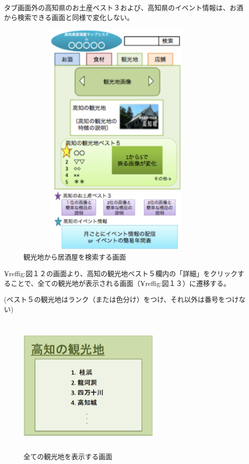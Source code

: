 \documentclass[a4j,titlepage]{jarticle}
\begin{document}
タブ画面外の高知県のお土産ベスト３および、高知県のイベント情報は、お酒から検索できる画面と同様で変化しない。
\clearpage
\begin {figure}[!htbp]
    \begin{center}
    \includegraphics [height=12cm, width=10cm]{12.eps}
    \caption {観光地から居酒屋を検索する画面}
    \label {fig:12}
    \end{center}
\end {figure}

¥ref{fig:図１２}の画面より、高知の観光地ベスト５欄内の「詳細」をクリックすることで、全ての観光地が表示される画面（¥ref{fig:図１３}）に遷移する。

(ベスト５の観光地はランク（または色分け）をつけ、それ以外は番号をつけない)
\clearpage
\begin {figure}[!htbp]
    \begin{center}
    \includegraphics [height=7cm, width=7cm]{13.eps}
    \caption {全ての観光地を表示する画面}
    \label {fig:13}
    \end{center}
\end {figure}
\end{document}
